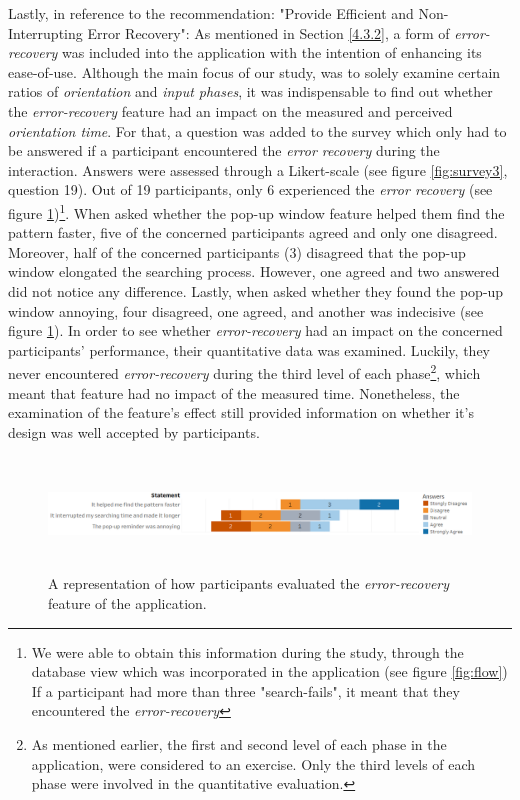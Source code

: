 Lastly, in reference to the recommendation: "Provide Efficient and Non-Interrupting Error Recovery": As mentioned in Section \ref{4.3.2}, a form of \textit{error-recovery} was included into the application with the intention of enhancing its ease-of-use. Although the main focus of our study, was to solely examine certain ratios of \textit{orientation} and \textit{input phases}, it was indispensable to find out whether the \textit{error-recovery} feature had an impact on the measured and perceived \textit{orientation time}. For that, a question was added to the survey which only had to be answered if a participant encountered the \textit{error recovery} during the interaction. Answers were assessed through a Likert-scale (see figure \ref{fig:survey3}, question 19). Out of 19 participants, only 6 experienced the \textit{error recovery} (see figure \ref{fig:error})\footnote{We were able to obtain this information during the study, through the database view which was incorporated in the application (see figure \ref{fig:flow}) If a participant had more than three "search-fails", it meant that they encountered the \textit{error-recovery}}. When asked whether the pop-up window feature helped them find the pattern faster, five of the concerned participants agreed and only one disagreed. Moreover, half of the concerned participants (3) disagreed that the pop-up window elongated the searching process. However, one agreed and two answered did not notice any difference. Lastly, when asked whether they found the pop-up window annoying, four disagreed, one agreed, and another was indecisive (see figure \ref{fig:error}). In order to see whether \textit{error-recovery} had an impact on the concerned participants' performance, their quantitative data was examined. Luckily, they never encountered \textit{error-recovery} during the third level of each phase\footnote{As mentioned earlier, the first and second level of each phase in the application, were considered to an exercise. Only the third levels of each phase were involved in the quantitative evaluation.}, which meant that feature had no impact of the measured time. Nonetheless, the examination of the feature's effect still provided information on whether it's design was well accepted by participants. 

\begin{figure}[t!]
\centering
\includegraphics[width=15cm, height=3cm]{Chapters/graphics/ErrorRecovery.png}
\caption{A representation of how participants evaluated the \textit{error-recovery} feature of the application.}
\label{fig:error}
\end{figure}


